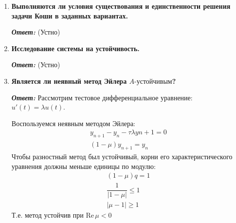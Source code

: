 \documentclass[12pt, a4paper]{article}
\begin{document}
\begin{enumerate}
		\item \textbf{Выполняются ли условия существования и единственности решения задачи Коши в заданных вариантах.}
		\vspace*{0.2cm} 
		
		\textit{\textbf{Ответ:}} 
		(Устно)
		
		\item \textbf{Исследование системы на устойчивость.}
		\vspace*{0.2cm} 
		
		\textit{\textbf{Ответ:}} 
		(Устно)
	
		
		\item \textbf{Является ли неявный метод Эйлера $A\text{-устойчивым}$?}
		\vspace*{0.2cm} 
		
		\textit{\textbf{Ответ:}} 
		Рассмотрим тестовое дифференциальное уравнение: $u'(t) = \lambda u(t)$.
		
		Воспользуемся неявным методом Эйлера:
		\begin{gather*}
		y_{n+1} - y_{n} - \tau \lambda y{n+1} = 0 \\
		(1-\mu) y_{n+1}  = y_{n}
		\end{gather*}
		Чтобы разностный метод был устойчивый, корни его характеристического уравнения должны меньше единицы по модулю:
		\begin{gather*}
			(1-\mu) q  = 1 \\
			\dfrac{1}{|1-\mu|} \le 1 \\
			|\mu - 1| \ge 1
		\end{gather*}
		Т.е. метод устойчив при $\text{Re} \, \mu < 0$
	\end{enumerate}
	
	
	
\end{document}
